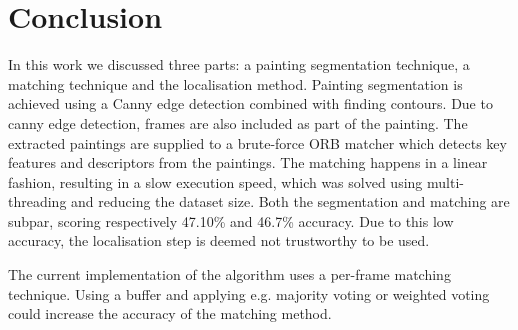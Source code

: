 \section{Conclusion}
\label{sec:conclusion}
In this work we discussed three parts: a painting segmentation technique, a matching technique and the localisation method. Painting segmentation is achieved using a Canny edge detection combined with finding contours. Due to canny edge detection, frames are also included as part of the painting. The extracted paintings are supplied to a brute-force ORB matcher which detects key features and descriptors from the paintings. The matching happens in a linear fashion, resulting in a slow execution speed, which was solved using multi-threading and reducing the dataset size. Both the segmentation and matching are subpar, scoring respectively 47.10\% and 46.7\% accuracy. Due to this low accuracy, the localisation step is deemed not trustworthy to be used.

The current implementation of the algorithm uses a per-frame matching technique. Using a buffer and applying e.g. majority voting or weighted voting could increase the accuracy of the matching method. 

